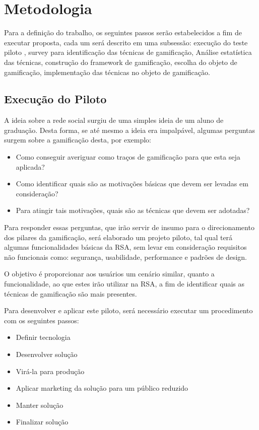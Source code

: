\chapter[Metodologia]{Metodologia}

Para a definição do trabalho, os seguintes
passos serão estabelecidos a fim de executar proposta, cada um será
descrito em uma subsessão: execução do teste piloto , survey para identificação das técnicas de gamificação,
Análise estatística das técnicas, construção do framework de gamificação, escolha do objeto de gamificação,
implementação das técnicas no objeto de gamificação.

\section{Execução do Piloto}
\label{sub:execu_o_do_piloto}
A ideia sobre a rede social surgiu de uma simples ideia de um aluno de graduação. Desta forma, se até mesmo a
ideia era impalpável, algumas perguntas surgem sobre a gamificação desta, por exemplo:

\begin{itemize}
    \item Como conseguir averiguar como traços de gamificação para que esta seja aplicada?
    \item Como identificar quais são as motivações básicas que devem ser levadas em consideração?
    \item Para atingir tais motivações, quais são as técnicas que devem ser adotadas?
\end{itemize}

Para responder essas perguntas, que irão servir de insumo para o direcionamento dos pilares da gamificação, será elaborado um projeto piloto, tal qual terá algumas funcionalidades básicas da RSA, sem levar em consideração requisitos não funcionais como: segurança, usabilidade, performance e padrões de design.

O objetivo é proporcionar aos usuários um cenário similar, quanto a funcionalidade, ao que estes irão utilizar
na RSA, a fim de identificar quais as técnicas de gamificação são mais presentes.

Para desenvolver e aplicar este piloto, será necessário executar um procedimento com os seguintes passos:

\begin{itemize}
    \item Definir tecnologia
    \item Desenvolver solução
    \item Virá-la para produção
    \item Aplicar marketing da solução para um público reduzido
    \item Manter solução
    \item Finalizar solução
\end{itemize}


